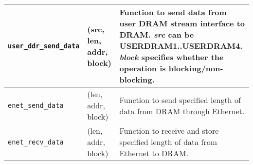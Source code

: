 \begin{longtable}{|l|l|p{6.5cm}|}
    {\texttt{user\_ddr\_send\_data}}     &    (src, len, addr, block)       &    Function to send data from user DRAM stream interface to DRAM. \emph{src} can be USERDRAM1..USERDRAM4. \emph{block} specifies whether the operation is blocking/non-blocking.\\\hline
    {\texttt{enet\_send\_data}}          &    (len, addr, block)            &    Function to send specified length of data from DRAM through Ethernet.\\\hline
    {\texttt{enet\_recv\_data}}          &    (len, addr, block)            &    Function to receive and store specified length of data from Ethernet to DRAM.\\\hline
\end{longtable}